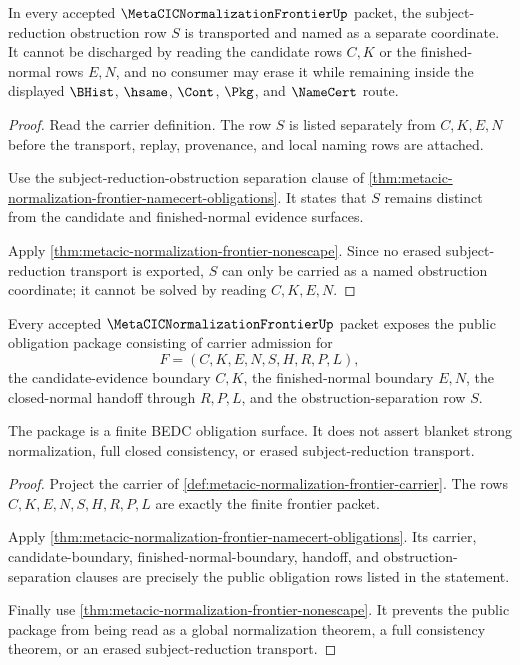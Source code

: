 \begin{theorem}
\label{thm:metacic-normalization-frontier-obstruction-ledger}
In every accepted $\MetaCICNormalizationFrontierUp$ packet, the subject-reduction obstruction row $S$ is transported and named as a separate coordinate. It cannot be discharged by reading the candidate rows $C,K$ or the finished-normal rows $E,N$, and no consumer may erase it while remaining inside the displayed $\BHist$, $\hsame$, $\Cont$, $\Pkg$, and $\NameCert$ route.
\end{theorem}
\begin{proof}
Read the carrier definition. The row $S$ is listed separately from $C,K,E,N$ before the transport, replay, provenance, and local naming rows are attached.

Use the subject-reduction-obstruction separation clause of \autoref{thm:metacic-normalization-frontier-namecert-obligations}. It states that $S$ remains distinct from the candidate and finished-normal evidence surfaces.

Apply \autoref{thm:metacic-normalization-frontier-nonescape}. Since no erased subject-reduction transport is exported, $S$ can only be carried as a named obstruction coordinate; it cannot be solved by reading $C,K,E,N$.
\end{proof}

\begin{theorem}
\label{thm:metacic-normalization-frontier-public-obligation-package}
Every accepted $\MetaCICNormalizationFrontierUp$ packet exposes the public obligation package consisting of carrier admission for
$$
F=(C,K,E,N,S,H,R,P,L),
$$
the candidate-evidence boundary $C,K$, the finished-normal boundary $E,N$, the closed-normal handoff through $R,P,L$, and the obstruction-separation row $S$.

The package is a finite BEDC obligation surface. It does not assert blanket strong normalization, full closed consistency, or erased subject-reduction transport.
\end{theorem}
\begin{proof}
Project the carrier of \autoref{def:metacic-normalization-frontier-carrier}. The rows $C,K,E,N,S,H,R,P,L$ are exactly the finite frontier packet.

Apply \autoref{thm:metacic-normalization-frontier-namecert-obligations}. Its carrier, candidate-boundary, finished-normal-boundary, handoff, and obstruction-separation clauses are precisely the public obligation rows listed in the statement.

Finally use \autoref{thm:metacic-normalization-frontier-nonescape}. It prevents the public package from being read as a global normalization theorem, a full consistency theorem, or an erased subject-reduction transport.
\end{proof}


